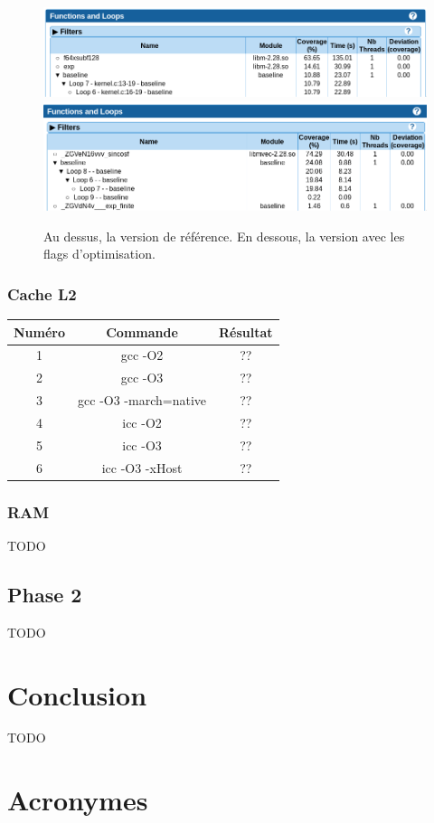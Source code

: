 \documentclass[12pt,a4paper]{article}
\begin{document}
\begin{figure}[h]
    \centering
    \includegraphics[scale=0.5]{./figures/L1/maqao_noopt_ref_func.png}
    \includegraphics[scale=0.5]{./figures/L1/maqao_noopt_opt_func.png}
    \caption{Au dessus, la version de référence. En dessous, la version avec les
    flags d'optimisation.}
    \label{fig.maqao_noopt_func}
\end{figure}

\subsubsection{Cache L2}

\begin{tabular}{|c|c|c|}
  \hline
	Numéro  & Commande & Résultat\\
  \hline
  1 & gcc -O2 & ?? \\
    \hline
  2 & gcc -O3 & ?? \\
    \hline
  3 & gcc -O3 -march=native & ?? \\
    \hline
  4 & icc -O2 & ?? \\
    \hline
  5 & icc -O3 & ?? \\
    \hline
  6 & icc -O3 -xHost & ?? \\
  \hline
\end{tabular}

\subsubsection{RAM}

TODO

\subsection{Phase 2}

TODO

\section{Conclusion}

TODO

\newpage
\section*{Acronymes}

\begin{acronym}
\end{acronym}
\end{document}
